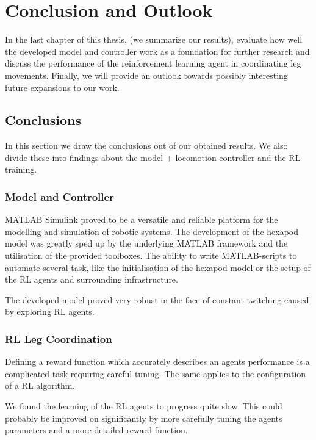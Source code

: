 \chapter{Conclusion and Outlook}
\label{ch:conclusion}

In the last chapter of this thesis, (we summarize our results), evaluate how well the developed model and controller work as a foundation for further research and discuss the performance of the reinforcement learning agent in coordinating leg movements.
Finally, we will provide an outlook towards possibly interesting future expansions to our work.


\section{Conclusions}
In this section we draw the conclusions out of our obtained results.
We also divide these into findings about the model + locomotion controller and the RL training.

\subsection{Model and Controller}
MATLAB Simulink proved to be a versatile and reliable platform for the modelling and simulation of robotic systems.
The development of the hexapod model was greatly sped up by the underlying MATLAB framework and the utilisation of the provided toolboxes.
The ability to write MATLAB-scripts to automate several task, like the initialisation of the hexapod model or the setup of the RL agents and surrounding infrastructure. 

The developed model proved very robust in the face of constant twitching caused by exploring RL agents.

\subsection{RL Leg Coordination}
Defining a reward function which accurately describes an agents performance is a complicated task requiring careful tuning.
The same applies to the configuration of a RL algorithm.

We found the learning of the RL agents to progress quite slow. 
This could probably be improved on significantly by more carefully tuning the agents parameters and a more detailed reward function.

